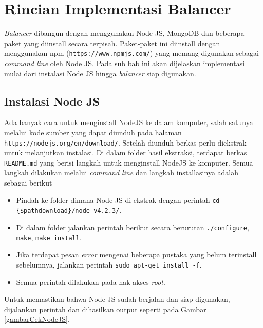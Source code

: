 \documentclass{ta-its}
\begin{document}
		\section{Rincian Implementasi Balancer}
		
			\textit{Balancer} dibangun dengan menggunakan Node JS, MongoDB dan beberapa paket yang diinstall secara terpisah. Paket-paket ini diinstall dengan menggunakan npm (\texttt{https://www.npmjs.com/}) yang memang digunakan sebagai \textit{command line} oleh Node JS. Pada sub bab ini akan dijelaskan implementasi mulai dari instalasi Node JS hingga \textit{balancer} siap digunakan.
			
			\subsection{Instalasi Node JS}
				Ada banyak cara untuk menginstall NodeJS ke dalam komputer, salah satunya melalui kode sumber yang dapat diunduh pada halaman \texttt{https://nodejs.org/en/download/}. Setelah diunduh berkas perlu diekstrak untuk melanjutkan instalasi. Di dalam folder hasil ekstraksi, terdapat berkas \texttt{README.md} yang berisi langkah untuk menginstall NodeJS ke komputer. Semua langkah dilakukan melalui \textit{command line} dan langkah installasinya adalah sebagai berikut
				
				\begin{itemize}
					\item Pindah ke folder dimana Node JS di ekstrak dengan perintah \texttt{cd \{\$pathdownload\}/node-v4.2.3/}.
					\item Di dalam folder jalankan perintah berikut secara berurutan \texttt{./configure}, \texttt{make}, \texttt{make install}.
					\item Jika terdapat pesan \textit{error} mengenai beberapa pustaka yang belum terinstall sebelumnya, jalankan perintah \texttt{sudo apt-get install -f}.
					\item Semua perintah dilakukan pada hak akses \textit{root}.
				\end{itemize}
				
				Untuk memastikan bahwa Node JS sudah berjalan dan siap digunakan, dijalankan perintah dan dihasilkan output seperti pada Gambar \ref{gambarCekNodeJS}.
				
\end{document}
